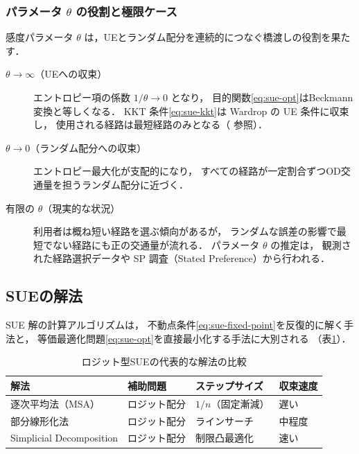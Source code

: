 \subsubsection*{パラメータ $\theta$ の役割と極限ケース}

感度パラメータ $\theta$ は，UEとランダム配分を連続的につなぐ橋渡しの役割を果たす．

\begin{description}
  \item[$\theta \to \infty$（UEへの収束）]
    エントロピー項の係数 $1/\theta \to 0$ となり，
    目的関数\eqref{eq:sue-opt}はBeckmann 変換と等しくなる．
    KKT 条件\eqref{eq:sue-kkt}は Wardrop の UE 条件に収束し，
    使用される経路は最短経路のみとなる（ 参照）．

  \item[$\theta \to 0$（ランダム配分への収束）]
    エントロピー最大化が支配的になり，
    すべての経路が一定割合ずつOD交通量を担うランダム配分に近づく．

  \item[有限の $\theta$（現実的な状況）]
    利用者は概ね短い経路を選ぶ傾向があるが，
    ランダムな誤差の影響で最短でない経路にも正の交通量が流れる．
    パラメータ $\theta$ の推定は，
    観測された経路選択データや SP 調査（Stated Preference）から行われる\cite{Sheffi1985}．
\end{description}

\subsection{SUEの解法}
\label{subsec:sue-algorithms}

SUE 解の計算アルゴリズムは，
不動点条件\eqref{eq:sue-fixed-point}を反復的に解く手法と，
等価最適化問題\eqref{eq:sue-opt}を直接最小化する手法に大別される
（表\ref{tab:sue-methods}）．

\begin{table}[hbtp]
  \centering
  \caption{ロジット型SUEの代表的な解法の比較}
  \label{tab:sue-methods}
  \begin{tabular}{llll}
    \toprule
    解法 & 補助問題 & ステップサイズ & 収束速度 \\
    \midrule
    逐次平均法（MSA）         & ロジット配分 & $1/n$（固定漸減） & 遅い  \\
    部分線形化法              & ロジット配分 & ラインサーチ      & 中程度 \\
    Simplicial Decomposition  & ロジット配分 & 制限凸最適化      & 速い  \\
    \bottomrule
  \end{tabular}
\end{table}

